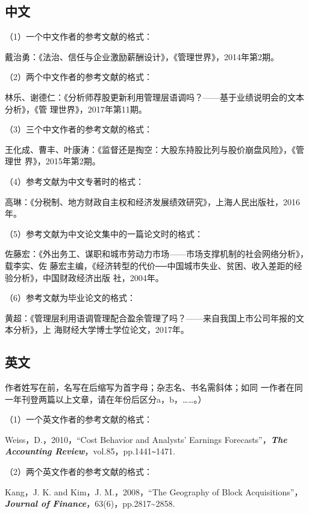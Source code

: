 \documentclass{article}
\begin{document}
\subsection{中文}
（1）一个中文作者的参考文献的格式：

戴治勇：《法治、信任与企业激励薪酬设计》，《管理世界》，2014年第2期。

（2）两个中文作者的参考文献的格式：

林乐、谢德仁：《分析师荐股更新利用管理层语调吗？——基于业绩说明会的文本分析》，《管
理世界》，2017年第11期。

（3）三个中文作者的参考文献的格式：

王化成、曹丰、叶康涛：《监督还是掏空：大股东持股比列与股价崩盘风险》，《管理世
界》，2015年第2期。

（4）参考文献为中文专著时的格式：

高琳：《分税制、地方财政自主权和经济发展绩效研究》，上海人民出版社，2016年。

（5）参考文献为中文论文集中的一篇论文时的格式：

佐藤宏：《外出务工、谋职和城市劳动力市场——市场支撑机制的社会网络分析》，载李实、佐
藤宏主编，《经济转型的代价──中国城市失业、贫困、收入差距的经验分析》，中国财政经济出版
社，2004年。

（6）参考文献为毕业论文的格式：

黄超：《管理层利用语调管理配合盈余管理了吗？——来自我国上市公司年报的文本分析》，上
海财经大学博士学位论文，2017年。

\subsection{英文}


作者姓写在前，名写在后缩写为首字母；杂志名、书名需斜体；如同
一作者在同一年刊登两篇以上文章，请在年份后区分a，b，……。）

（1）一个英文作者的参考文献的格式：

Weiss，D.，2010，“Cost Behavior and Analysts’ Earnings Forecasts”，\textbf{\textit{The
Accounting Review}}，vol.85，pp.1441\verb|~|1471.

（2）两个英文作者的参考文献的格式：

Kang，J. K. and Kim，J. M.，2008，“The Geography of Block Acquisitions”，\textbf{\textit{Journal
of Finance}}，63(6)，pp.2817\textasciitilde 2858.
\end{document}
